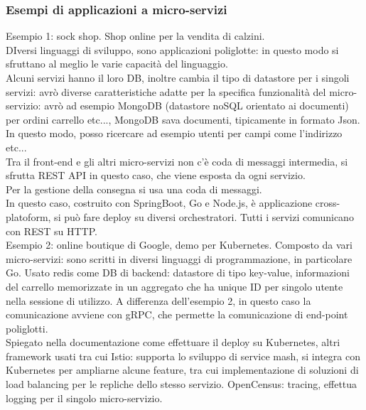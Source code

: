 \documentclass[16px]{article}
\begin{document}
\subsubsection{Esempi di applicazioni a micro-servizi}
Esempio 1: sock shop. Shop online per la vendita di calzini.\\ DIversi linguaggi di sviluppo, sono applicazioni poliglotte: in questo modo si sfruttano al meglio le varie capacità del linguaggio.\\ Alcuni servizi hanno il loro DB, inoltre cambia il tipo di datastore per i singoli servizi: avrò diverse caratteristiche adatte per la specifica funzionalità del micro-servizio: avrò ad esempio MongoDB (datastore noSQL orientato ai documenti) per ordini carrello etc..., MongoDB sava documenti, tipicamente in formato Json. In questo modo, posso ricercare ad esempio utenti per campi come l'indirizzo etc...\\ Tra il front-end e gli altri micro-servizi non c'è coda di messaggi intermedia, si sfrutta REST API in questo caso, che viene esposta da ogni servizio.\\ Per la gestione della consegna si usa una coda di messaggi.\\ In questo caso, costruito con SpringBoot, Go e Node.js, è applicazione cross-platoform, si può fare deploy su diversi orchestratori. Tutti i servizi comunicano con REST su HTTP.\\ Esempio 2: online boutique di Google, demo per Kubernetes. Composto da vari micro-servizi: sono scritti in diversi linguaggi di programmazione, in particolare Go. Usato redis come DB di backend: datastore di tipo key-value, informazioni del carrello memorizzate in un aggregato che ha unique ID per singolo utente nella sessione di utilizzo. A differenza dell'esempio 2, in questo caso la comunicazione avviene con gRPC, che permette la comunicazione di end-point poliglotti.\\ Spiegato nella documentazione come effettuare il deploy su Kubernetes, altri framework usati tra cui Istio: supporta lo sviluppo di service mash, si integra con Kubernetes per ampliarne alcune feature, tra cui implementazione di soluzioni di load balancing per le repliche dello stesso servizio. OpenCensus: tracing, effettua logging per il singolo micro-servizio.\\
\end{document}
